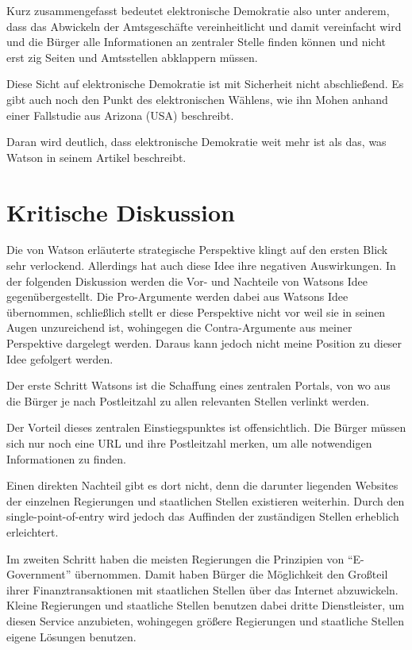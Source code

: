\documentclass[12pt,twoside,ngerman]{scrartcl}
\theoremstyle{plain}
\theoremstyle{definition}
\theoremstyle{remark}
\begin{document}
	Kurz zusammengefasst bedeutet elektronische Demokratie also unter anderem, dass das Abwickeln der Amtsgeschäfte vereinheitlicht und damit vereinfacht wird und die Bürger alle Informationen an zentraler Stelle finden können und nicht erst zig Seiten und Amtsstellen abklappern müssen.
	
	Diese Sicht auf elektronische Demokratie ist mit Sicherheit nicht abschließend. Es gibt auch noch den Punkt des elektronischen Wählens, wie ihn Mohen\cite{Mohen2001} anhand einer Fallstudie aus Arizona (USA) beschreibt.
	
	Daran wird deutlich, dass elektronische Demokratie weit mehr ist als das, was Watson in seinem Artikel beschreibt.
	
\section{Kritische Diskussion}
\label{sec:critDisc}

	Die von Watson\cite{Watson2001} erläuterte strategische Perspektive klingt auf den ersten Blick sehr verlockend. Allerdings hat auch diese Idee ihre negativen Auswirkungen. In der folgenden Diskussion werden die Vor- und Nachteile von Watsons Idee gegenübergestellt. Die Pro-Argumente werden dabei aus Watsons Idee übernommen, schließlich stellt er diese Perspektive nicht vor weil sie in seinen Augen unzureichend ist, wohingegen die Contra-Argumente aus meiner Perspektive dargelegt werden. Daraus kann jedoch nicht meine Position zu dieser Idee gefolgert werden.
	
	Der erste Schritt Watsons ist die Schaffung eines zentralen Portals, von wo aus die Bürger je nach Postleitzahl zu allen relevanten Stellen verlinkt werden. 
	
	Der Vorteil dieses zentralen Einstiegspunktes ist offensichtlich. Die Bürger müssen sich nur noch eine URL und ihre Postleitzahl merken, um alle notwendigen Informationen zu finden.
	
	Einen direkten Nachteil gibt es dort nicht, denn die darunter liegenden Websites der einzelnen Regierungen und staatlichen Stellen existieren weiterhin. Durch den single-point-of-entry wird jedoch das Auffinden der zuständigen Stellen erheblich erleichtert.
	
	Im zweiten Schritt haben die meisten Regierungen die Prinzipien von "`E-Government"' übernommen. Damit haben Bürger die Möglichkeit den Großteil ihrer Finanztransaktionen mit staatlichen Stellen über das Internet abzuwickeln. Kleine Regierungen und staatliche Stellen benutzen dabei dritte Dienstleister, um diesen Service anzubieten, wohingegen größere Regierungen und staatliche Stellen eigene Lösungen benutzen.
	
\end{document}
